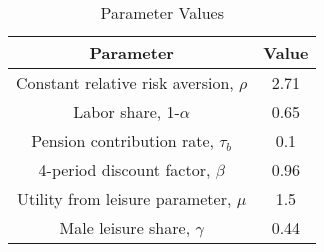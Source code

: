 \newlength\TableWidth
\newsavebox{\Parameters}
\begin{table}
	
	\renewcommand{\arraystretch}{1.2}
	\caption{Parameter Values}\
\begin{center}
	\begin{tabular}{ |c|c| } 
		
		Parameter & Value \\ 
		\hline
		Constant relative risk aversion, $\rho$ & 2.71\\
		Labor share, 1-$\alpha$ & 0.65\\
		Pension contribution rate, $\tau_b$ & 0.1\\
		4-period discount factor, $\beta$ & 0.96\\
		Utility from leisure parameter, $\mu$ & 1.5\\
		Male leisure share, $\gamma$ & 0.44 \\
		
	\end{tabular}
\end{center}


\end{table}





